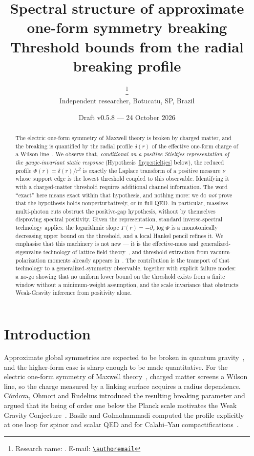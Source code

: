 \documentclass[11pt]{article}
\title{\bf Spectral structure of approximate one-form symmetry breaking\\
\large Threshold bounds from the radial breaking profile}
\author{\authorname\thanks{Research name: \researchname.
  E-mail: \href{mailto:\authoremail}{\nolinkurl{\authoremail}}}\\[2pt]
  \small Independent researcher, Botucatu, SP, Brazil}
\date{\small Draft v0.5.8 --- 24 October 2026}
\theoremstyle{definition}
\theoremstyle{remark}
\begin{document}
\maketitle

\begin{abstract}
\noindent
The electric one-form symmetry of Maxwell theory is broken by charged matter,
and the breaking is quantified by the radial profile $\delta(r)$ of the
effective one-form charge of a Wilson line~\cite{cordova_ohmori_rudelius_2022,
basile_golmohammadi_2025}. We observe that, \emph{conditional on a positive
Stieltjes representation of the gauge-invariant static response}
(Hypothesis~\ref{hyp:stieltjes} below), the reduced profile
$\Phi(r)=\delta(r)/r^{2}$ is exactly the Laplace transform of a positive
measure $\nu$ whose support edge is the lowest threshold coupled to this
observable. Identifying it with a charged-matter threshold requires additional
channel information.
The word ``exact'' here means exact within that hypothesis, and nothing more:
we do \emph{not} prove that the hypothesis holds nonperturbatively, or in full
QED. In particular, massless multi-photon cuts obstruct the positive-gap
hypothesis, without by themselves disproving spectral positivity. Given the representation,
standard inverse-spectral technology applies: the logarithmic slope
$\Gamma(r)=-\partial_{r}\log\Phi$ is a monotonically decreasing upper bound on
the threshold, and a local Hankel pencil refines it. We emphasise that this
machinery is not new --- it is the effective-mass and generalized-eigenvalue
technology of lattice field theory~\cite{luscher_wolff_1990,
blossier_et_al_gevp_2009}, and threshold extraction from vacuum-polarization
moments already appears in~\cite{masjuan_peris_2009}. The contribution is the
transport of that technology to a generalized-symmetry observable, together
with explicit failure modes: a no-go showing that no uniform lower bound on the
threshold exists from a finite window without a minimum-weight assumption, and
the scale invariance that obstructs Weak-Gravity inference from positivity
alone.
\end{abstract}

\section{Introduction}

Approximate global symmetries are expected to be broken in quantum
gravity~\cite{banks_seiberg_2010,harlow_ooguri_2018}, and the higher-form case
is sharp enough to be made quantitative. For the electric one-form symmetry of
Maxwell theory~\cite{gaiotto_kapustin_seiberg_willett_2015}, charged matter
screens a Wilson line, so the charge measured by a linking surface acquires a
radius dependence. C\'ordova, Ohmori and Rudelius introduced the resulting
breaking parameter and argued that its being of order one below the Planck
scale motivates the Weak Gravity
Conjecture~\cite{cordova_ohmori_rudelius_2022,arkanihamed_motl_nicolis_vafa_2006}.
Basile and Golmohammadi computed the profile explicitly at one loop for spinor
and scalar QED and for Calabi--Yau
compactifications~\cite{basile_golmohammadi_2025}.
\end{document}
